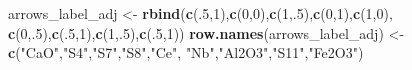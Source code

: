 \documentclass[12pt,]{book}
\newenvironment{Shaded}{\begin{snugshade}}{\end{snugshade}}
\newcommand{\DecValTok}[1]{\textcolor[rgb]{0.00,0.00,0.81}{#1}}
\newcommand{\KeywordTok}[1]{\textcolor[rgb]{0.13,0.29,0.53}{\textbf{#1}}}
\newcommand{\NormalTok}[1]{#1}
\newcommand{\StringTok}[1]{\textcolor[rgb]{0.31,0.60,0.02}{#1}}
\begin{document}
\begin{Shaded}
\begin{Highlighting}[]
\NormalTok{arrows_label_adj <-}\StringTok{ }\KeywordTok{rbind}\NormalTok{(}\KeywordTok{c}\NormalTok{(.}\DecValTok{5}\NormalTok{,}\DecValTok{1}\NormalTok{),}\KeywordTok{c}\NormalTok{(}\DecValTok{0}\NormalTok{,}\DecValTok{0}\NormalTok{),}\KeywordTok{c}\NormalTok{(}\DecValTok{1}\NormalTok{,.}\DecValTok{5}\NormalTok{),}\KeywordTok{c}\NormalTok{(}\DecValTok{0}\NormalTok{,}\DecValTok{1}\NormalTok{),}\KeywordTok{c}\NormalTok{(}\DecValTok{1}\NormalTok{,}\DecValTok{0}\NormalTok{),}
                          \KeywordTok{c}\NormalTok{(}\DecValTok{0}\NormalTok{,.}\DecValTok{5}\NormalTok{),}\KeywordTok{c}\NormalTok{(.}\DecValTok{5}\NormalTok{,}\DecValTok{1}\NormalTok{),}\KeywordTok{c}\NormalTok{(}\DecValTok{1}\NormalTok{,.}\DecValTok{5}\NormalTok{),}\KeywordTok{c}\NormalTok{(.}\DecValTok{5}\NormalTok{,}\DecValTok{1}\NormalTok{))}
\KeywordTok{row.names}\NormalTok{(arrows_label_adj) <-}\StringTok{ }\KeywordTok{c}\NormalTok{(}\StringTok{"CaO"}\NormalTok{,}\StringTok{"S4"}\NormalTok{,}\StringTok{"S7"}\NormalTok{,}\StringTok{"S8"}\NormalTok{,}\StringTok{"Ce"}\NormalTok{,}
                                 \StringTok{"Nb"}\NormalTok{,}\StringTok{"Al2O3"}\NormalTok{,}\StringTok{"S11"}\NormalTok{,}\StringTok{"Fe2O3"}\NormalTok{)}


\end{Highlighting}
\end{Shaded}
\end{document}
